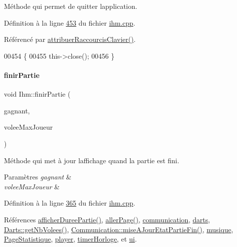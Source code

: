 Méthode qui permet de quitter l\textquotesingle{}application. 



Définition à la ligne \hyperlink{ihm_8cpp_source_l00453}{453} du fichier \hyperlink{ihm_8cpp_source}{ihm.\+cpp}.



Référencé par \hyperlink{ihm_8cpp_source_l00103}{attribuer\+Raccourcis\+Clavier()}.


\begin{DoxyCode}
00454 \{
00455     this->close();
00456 \}
\end{DoxyCode}
\mbox{\label{class_ihm_a0c7ee6ee6313db87c7cc34dbd57dd57d}} 
\paragraph{\texorpdfstring{finir\+Partie}{finirPartie}}
{\footnotesize\ttfamily void Ihm\+::finir\+Partie (\begin{DoxyParamCaption}\item[{Q\+String}]{gagnant,  }\item[{int}]{volee\+Max\+Joueur }\end{DoxyParamCaption})\hspace{0.3cm}{\ttfamily [slot]}}



Méthode qui met à jour l\textquotesingle{}affichage quand la partie est fini. 


\begin{DoxyParams}{Paramètres}
{\em gagnant} & \\
\hline
{\em volee\+Max\+Joueur} & \\
\hline
\end{DoxyParams}


Définition à la ligne \hyperlink{ihm_8cpp_source_l00365}{365} du fichier \hyperlink{ihm_8cpp_source}{ihm.\+cpp}.



Références \hyperlink{ihm_8cpp_source_l00484}{afficher\+Duree\+Partie()}, \hyperlink{ihm_8cpp_source_l00429}{aller\+Page()}, \hyperlink{ihm_8h_source_l00054}{communication}, \hyperlink{ihm_8h_source_l00055}{darts}, \hyperlink{darts_8cpp_source_l00088}{Darts\+::get\+Nb\+Volees()}, \hyperlink{communication_8cpp_source_l00404}{Communication\+::mise\+A\+Jour\+Etat\+Partie\+Fin()}, \hyperlink{ihm_8h_source_l00056}{musique}, \hyperlink{ihm_8h_source_l00077}{Page\+Statistique}, \hyperlink{ihm_8h_source_l00064}{player}, \hyperlink{ihm_8h_source_l00053}{timer\+Horloge}, et \hyperlink{ihm_8h_source_l00052}{ui}.



